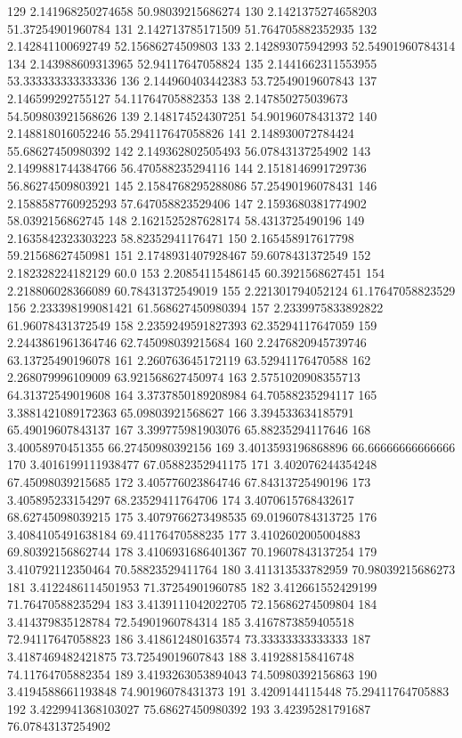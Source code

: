 {129 2.141968250274658 50.98039215686274
130 2.1421375274658203 51.37254901960784
131 2.142713785171509 51.764705882352935
132 2.142841100692749 52.15686274509803
133 2.142893075942993 52.54901960784314
134 2.143988609313965 52.94117647058824
135 2.1441662311553955 53.333333333333336
136 2.144960403442383 53.72549019607843
137 2.146599292755127 54.11764705882353
138 2.147850275039673 54.509803921568626
139 2.148174524307251 54.90196078431372
140 2.148818016052246 55.294117647058826
141 2.148930072784424 55.68627450980392
142 2.149362802505493 56.07843137254902
143 2.1499881744384766 56.470588235294116
144 2.1518146991729736 56.86274509803921
145 2.1584768295288086 57.25490196078431
146 2.1588587760925293 57.647058823529406
147 2.1593680381774902 58.0392156862745
148 2.1621525287628174 58.4313725490196
149 2.1635842323303223 58.82352941176471
150 2.165458917617798 59.21568627450981
151 2.1748931407928467 59.6078431372549
152 2.182328224182129 60.0
153 2.20854115486145 60.3921568627451
154 2.218806028366089 60.78431372549019
155 2.221301794052124 61.17647058823529
156 2.233398199081421 61.568627450980394
157 2.2339975833892822 61.96078431372549
158 2.2359249591827393 62.35294117647059
159 2.2443861961364746 62.745098039215684
160 2.2476820945739746 63.13725490196078
161 2.260763645172119 63.52941176470588
162 2.268079996109009 63.921568627450974
163 2.5751020908355713 64.31372549019608
164 3.3737850189208984 64.70588235294117
165 3.3881421089172363 65.09803921568627
166 3.394533634185791 65.49019607843137
167 3.399775981903076 65.88235294117646
168 3.40058970451355 66.27450980392156
169 3.4013593196868896 66.66666666666666
170 3.4016199111938477 67.05882352941175
171 3.402076244354248 67.45098039215685
172 3.405776023864746 67.84313725490196
173 3.405895233154297 68.23529411764706
174 3.4070615768432617 68.62745098039215
175 3.4079766273498535 69.01960784313725
176 3.4084105491638184 69.41176470588235
177 3.4102602005004883 69.80392156862744
178 3.4106931686401367 70.19607843137254
179 3.410792112350464 70.58823529411764
180 3.411313533782959 70.98039215686273
181 3.4122486114501953 71.37254901960785
182 3.412661552429199 71.76470588235294
183 3.4139111042022705 72.15686274509804
184 3.414379835128784 72.54901960784314
185 3.4167873859405518 72.94117647058823
186 3.418612480163574 73.33333333333333
187 3.4187469482421875 73.72549019607843
188 3.419288158416748 74.11764705882354
189 3.4193263053894043 74.50980392156863
190 3.4194588661193848 74.90196078431373
191 3.4209144115448 75.29411764705883
192 3.4229941368103027 75.68627450980392
193 3.42395281791687 76.07843137254902
}
